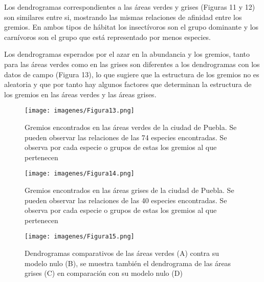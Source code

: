 \documentclass[letterpaper,12pt]{article}
\begin{document}
Los dendrogramas correspondientes a las áreas verdes y grises (Figuras 11 y 12) son similares entre si, mostrando las mismas relaciones de afinidad entre los gremios. En ambos tipos de hábitat los insectívoros son el grupo dominante y los carnívoros son el grupo que está representado por menos especies.

Los dendrogramas esperados por el azar en la abundancia y los gremios, tanto para las áreas verdes como en las grises son diferentes a los dendrogramas con los datos de campo (Figura 13), lo que sugiere que la estructura de los gremios no es aleatoria y que por tanto hay algunos factores que determinan la estructura de los gremios en las áreas verdes y las áreas grises. 
\begin{center}
\begin{figure}[H]
\texttt{[image: imagenes/Figura13.png]}\\
\caption[Gremios de las áreas verdes]{Gremios encontrados en las áreas verdes  de la ciudad de Puebla. Se pueden observar las relaciones de las 74 especies encontradas. Se observa por cada especie o grupos de estas los gremios al que pertenecen}
\end{figure}
\end{center}



\begin{center}
\begin{figure}[H]
\texttt{[image: imagenes/Figura14.png]}\\
\caption[Gremios de las áreas grises]{Gremios encontrados en las áreas grises  de la ciudad de Puebla. Se pueden observar las relaciones de las 40 especies encontradas. Se observa por cada especie o grupos de estas los gremios al que pertenecen}
\end{figure}
\end{center}

\begin{center}
\begin{figure}[H]
\texttt{[image: imagenes/Figura15.png]}\\
\caption[Comparación entre modelos nulos y gremios observados]{Dendrogramas comparativos de las áreas verdes (A) contra su modelo nulo (B), se muestra también el dendrograma de las áreas grises (C) en comparación con su modelo nulo (D) }
\end{figure}
\end{center}\\[5cm]
\afterpage{\clearpage}
\end{document}
